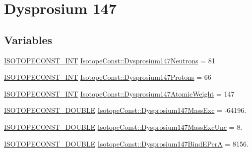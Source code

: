 \hypertarget{group___isotope_const-_dysprosium-_dy147}{}\section{Dysprosium 147}
\label{group___isotope_const-_dysprosium-_dy147}
\subsection*{Variables}
\begin{DoxyCompactItemize}
\item 
\mbox{\hyperlink{group___isotope_const-_macros_ga5f18360b3e99483a35c32d789e62621c}{I\+S\+O\+T\+O\+P\+E\+C\+O\+N\+S\+T\+\_\+\+I\+NT}} \mbox{\hyperlink{group___isotope_const-_dysprosium-_dy147_ga98a60e0cd06a05a6cd66c615204732f0}{Isotope\+Const\+::\+Dysprosium147\+Neutrons}} = 81
\item 
\mbox{\hyperlink{group___isotope_const-_macros_ga5f18360b3e99483a35c32d789e62621c}{I\+S\+O\+T\+O\+P\+E\+C\+O\+N\+S\+T\+\_\+\+I\+NT}} \mbox{\hyperlink{group___isotope_const-_dysprosium-_dy147_gaec6269d0ad07c9eb1e9196da45d2f1ab}{Isotope\+Const\+::\+Dysprosium147\+Protons}} = 66
\item 
\mbox{\hyperlink{group___isotope_const-_macros_ga5f18360b3e99483a35c32d789e62621c}{I\+S\+O\+T\+O\+P\+E\+C\+O\+N\+S\+T\+\_\+\+I\+NT}} \mbox{\hyperlink{group___isotope_const-_dysprosium-_dy147_gab959df1140c5aeaeea4bc21f35ad348f}{Isotope\+Const\+::\+Dysprosium147\+Atomic\+Weight}} = 147
\item 
\mbox{\hyperlink{group___isotope_const-_macros_ga8f45a7272ce02c0b4c65c44636ed719a}{I\+S\+O\+T\+O\+P\+E\+C\+O\+N\+S\+T\+\_\+\+D\+O\+U\+B\+LE}} \mbox{\hyperlink{group___isotope_const-_dysprosium-_dy147_ga79631ba44c3a137ee95988095c7ca8d3}{Isotope\+Const\+::\+Dysprosium147\+Mass\+Exc}} = -\/64196.
\item 
\mbox{\hyperlink{group___isotope_const-_macros_ga8f45a7272ce02c0b4c65c44636ed719a}{I\+S\+O\+T\+O\+P\+E\+C\+O\+N\+S\+T\+\_\+\+D\+O\+U\+B\+LE}} \mbox{\hyperlink{group___isotope_const-_dysprosium-_dy147_ga85efac451036737c4dd64741036eef42}{Isotope\+Const\+::\+Dysprosium147\+Mass\+Exc\+Unc}} = 8.
\item 
\mbox{\hyperlink{group___isotope_const-_macros_ga8f45a7272ce02c0b4c65c44636ed719a}{I\+S\+O\+T\+O\+P\+E\+C\+O\+N\+S\+T\+\_\+\+D\+O\+U\+B\+LE}} \mbox{\hyperlink{group___isotope_const-_dysprosium-_dy147_ga20fd40a256f2264aa9f2061c67cf9fbc}{Isotope\+Const\+::\+Dysprosium147\+Bind\+E\+PerA}} = 8156.

\end{DoxyCompactItemize}
